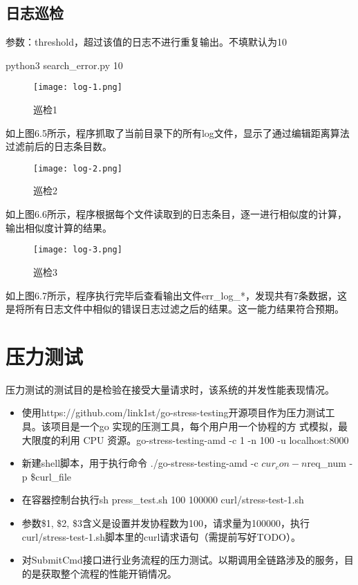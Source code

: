 

\subsection{日志巡检}

参数：threshold，超过该值的日志不进行重复输出。不填默认为10

python3 search\_error.py 10

\begin{figure}[H]
    \centering
    \texttt{[image: log-1.png]}
    \caption{巡检1}
    \label{fig:6-4-1}
\end{figure}
如上图6.5所示，程序抓取了当前目录下的所有log文件，显示了通过编辑距离算法过滤前后的日志条目数。

\begin{figure}[H]
    \centering
    \texttt{[image: log-2.png]}
    \caption{巡检2}
    \label{fig:6-4-2}
\end{figure}
如上图6.6所示，程序根据每个文件读取到的日志条目，逐一进行相似度的计算，输出相似度计算的结果。

\begin{figure}[H]
    \centering
    \texttt{[image: log-3.png]}
    \caption{巡检3}
    \label{fig:6-4-3}
\end{figure}
如上图6.7所示，程序执行完毕后查看输出文件err\_log\_*，发现共有7条数据，这是将所有日志文件中相似的错误日志过滤之后的结果。这一能力结果符合预期。

%


\section{压力测试}
压力测试的测试目的是检验在接受大量请求时，该系统的并发性能表现情况。

\begin{itemize}
    \item 使用https://github.com/link1st/go-stress-testing开源项目作为压力测试工具。该项目是一个go 实现的压测工具，每个用户用一个协程的方
式模拟，最大限度的利用 CPU 资源。go-stress-testing-amd -c 1 -n 100 -u localhost:8000
    \item 新建shell脚本，用于执行命令 ./go-stress-testing-amd -c $cur_con -n $req\_num -p \$curl\_file
    \item 在容器控制台执行sh press\_test.sh 100 100000 curl/stress-test-1.sh\cite{zw5}
    \item 参数\$1, \$2, \$3含义是设置并发协程数为100，请求量为100000，执行curl/stress-test-1.sh脚本里的curl请求语句（需提前写好TODO）。
    \item 对SubmitCmd接口进行业务流程的压力测试。以期调用全链路涉及的服务，目的是获取整个流程的性能开销情况。
\end{itemize}

